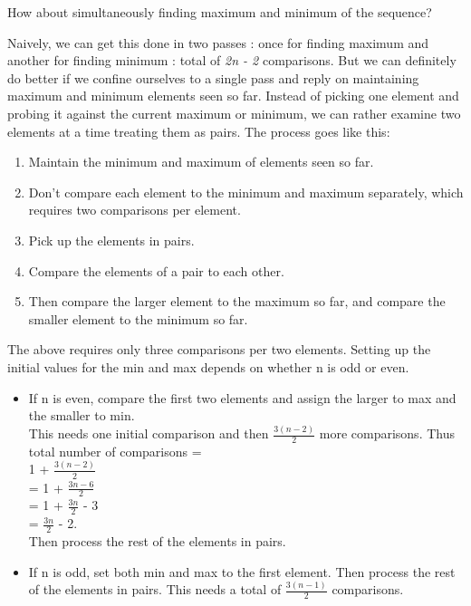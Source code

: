 \vspace{1mm}

How about simultaneously finding maximum and minimum of the sequence? 

Naively, we can get this done in two passes : once for finding maximum and another for finding minimum : total of \emph{2n - 2} comparisons. But we can definitely do better if we confine ourselves to a single pass and reply on maintaining maximum and minimum elements seen so far. Instead of picking one element and probing it against the current maximum or minimum, we can rather examine two elements at a time treating them as pairs. The process goes like this:
\begin{enumerate}
    \item Maintain the minimum and maximum of elements seen so far.
    \item Don\rq{}t compare each element to the minimum and maximum separately, which requires two comparisons per element.
    \item Pick up the elements in pairs.
    \item Compare the elements of a pair to each other.
    \item Then compare the larger element to the maximum so far, and compare the
smaller element to the minimum so far. 
\end{enumerate}
The above requires only three comparisons per two elements. Setting up the initial values for the min and max depends on whether n is odd or even.
\begin{itemize}
    \item If n is even, compare the first two elements and assign the larger to max and the smaller to min. \vspace{1mm}\\This needs one initial comparison and then $\frac{3(n - 2)}{2}$ more comparisons. Thus total number of comparisons = \vspace{1mm}\\ 1 + $\frac{3(n - 2)}{2}$\\ = 1 + $\frac{3n - 6}{2}$\\ = 1 + $\frac{3n}{2}$ - 3\\ =  $\frac{3n}{2}$ - 2. \vspace{1mm}\\Then process the rest of the elements in pairs. 
    \item If n is odd, set both min and max to the first element. Then process the rest of the elements in pairs. This needs a total of $\frac{3(n - 1)}{2}$ comparisons.
\end{itemize}

